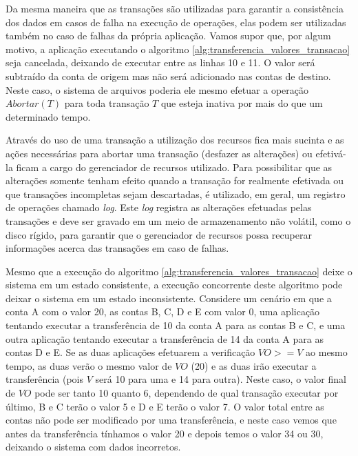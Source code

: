 \documentclass[11pt,twoside,a4paper]{book}
\begin{document}
Da mesma maneira que as transações são utilizadas para garantir a consistência dos dados em casos de falha na execução de operações, elas podem ser utilizadas também no caso de falhas da própria aplicação. Vamos supor que, por algum motivo, a aplicação executando o algoritmo \ref{alg:transferencia_valores_transacao} seja cancelada, deixando de executar entre as linhas 10 e 11. O valor será subtraído da conta de origem mas não será adicionado nas contas de destino. Neste caso, o sistema de arquivos poderia ele mesmo efetuar a operação $Abortar(T)$ para toda transação $T$ que esteja inativa por mais do que um determinado tempo.

Através do uso de uma transação a utilização dos recursos fica mais sucinta e as ações necessárias para abortar uma transação (desfazer as alterações) ou efetivá-la ficam a cargo do gerenciador de recursos utilizado. Para possibilitar que as alterações somente tenham efeito quando a transação for realmente efetivada ou que transações incompletas sejam descartadas, é utilizado, em geral, um registro de operações chamado \emph{log}. Este \emph{log} registra as alterações efetuadas pelas transações e deve ser gravado em um meio de armazenamento não volátil, como o disco rígido, para garantir que o gerenciador de recursos possa recuperar informações acerca das transações em caso de falhas.

Mesmo que a execução do algoritmo \ref{alg:transferencia_valores_transacao} deixe o sistema em um estado consistente, a execução concorrente deste algoritmo pode deixar o sistema em um estado inconsistente. Considere um cenário em que a conta A com o valor 20, as contas B, C, D e E com valor 0, uma aplicação tentando executar a transferência de 10 da conta A para as contas B e C, e uma outra aplicação tentando executar a transferência de 14 da conta A para as contas D e E. Se as duas aplicações efetuarem a verificação $VO >= V$ ao mesmo tempo, as duas verão o mesmo valor de $VO$ (20) e as duas irão executar a transferência (pois $V$ será 10 para uma e 14 para outra). Neste caso, o valor final de $VO$ pode ser tanto 10 quanto 6, dependendo de qual transação executar por último, B e C terão o valor 5 e D e E terão o valor 7. O valor total entre as contas não pode ser modificado por uma transferência, e neste caso vemos que antes da transferência tínhamos o valor 20 e depois temos o valor 34 ou 30, deixando o sistema com dados incorretos.
\end{document}
